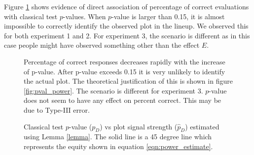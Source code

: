 \documentclass{article}
\newcommand{\blue}[1]{{\color{blue} #1}} %
\newcommand{\hh}[1]{{\color{orange} #1}} %
\begin{document}
Figure \ref{fig:pval_pcorrect} shows evidence of direct association of percentage of correct evaluations with classical test $p$-values. When $p$-value is larger than 0.15, it is almost impossible to correctly identify the observed plot in the lineup. We observed this for both experiment 1 and 2. For experiment 3, the scenario is different as in this case people might have observed something other than the effect $E$.

\begin{figure}[hbtp]
   \centering
       \caption{Percentage of correct responses decreases rapidly with the increase of p-value. After p-value exceeds 0.15 it is very unlikely to identify the actual plot. The theoretical justification of this is shown in figure \ref{fig:pval_power}. \blue{The scenario is different for experiment 3. $p$-value does not seem to have any effect on percent correct. This may be due to Type-III error.} }
       \label{fig:pval_pcorrect}
\end{figure}

\begin{figure}[hbtp]
   \centering
       \caption{Classical test $p$-value ($p_D$) vs plot signal strength ($\hat p_D$) estimated using Lemma \ref{lemma}. The solid line is a 45 degree line which represents the equity shown in equation \ref{eqn:power_estimate}.}
       \label{fig:pval_plot_signal}
\end{figure}
\end{document}
